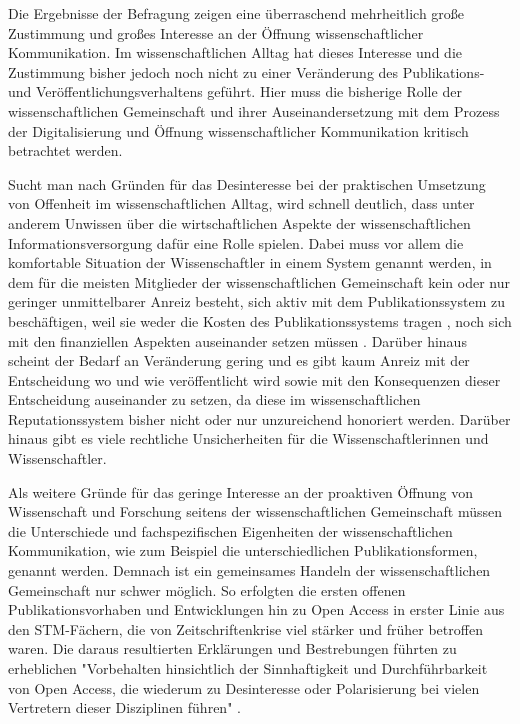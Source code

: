 Die Ergebnisse der Befragung zeigen eine überraschend mehrheitlich große Zustimmung und großes Interesse an der Öffnung wissenschaftlicher Kommunikation. Im wissenschaftlichen Alltag hat dieses Interesse und die Zustimmung bisher jedoch noch nicht zu einer Veränderung des Publikations- und Veröffentlichungsverhaltens geführt. Hier muss die bisherige Rolle der wissenschaftlichen Gemeinschaft und ihrer Auseinandersetzung mit dem Prozess der Digitalisierung und Öffnung wissenschaftlicher Kommunikation kritisch betrachtet werden.

Sucht man nach Gründen für das Desinteresse bei der praktischen Umsetzung von Offenheit im wissenschaftlichen Alltag, wird schnell deutlich, dass unter anderem Unwissen über die wirtschaftlichen Aspekte der wissenschaftlichen Informationsversorgung dafür eine Rolle spielen. Dabei muss vor allem die komfortable Situation der Wissenschaftler in einem System genannt werden, in dem für die meisten Mitglieder der wissenschaftlichen Gemeinschaft kein oder nur geringer unmittelbarer Anreiz besteht, sich aktiv mit dem Publikationssystem zu beschäftigen, weil sie weder die Kosten des Publikationssystems tragen \cite{Sietmann_oa_2007}, noch sich mit den finanziellen Aspekten auseinander setzen müssen \cite{herb_2010}. Darüber hinaus scheint der Bedarf an Veränderung gering und es gibt kaum Anreiz mit der Entscheidung wo und wie veröffentlicht wird sowie mit den Konsequenzen dieser Entscheidung auseinander zu setzen, da diese im wissenschaftlichen Reputationssystem bisher nicht oder nur unzureichend honoriert werden. Darüber hinaus gibt es viele rechtliche Unsicherheiten für die Wissenschaftlerinnen und Wissenschaftler.

Als weitere Gründe für das geringe Interesse an der proaktiven Öffnung von Wissenschaft und Forschung seitens der wissenschaftlichen Gemeinschaft müssen die Unterschiede und fachspezifischen Eigenheiten der wissenschaftlichen Kommunikation, wie zum Beispiel die unterschiedlichen Publikationsformen, genannt werden. Demnach ist ein gemeinsames Handeln der wissenschaftlichen Gemeinschaft nur schwer möglich. So erfolgten die ersten offenen Publikationsvorhaben und Entwicklungen hin zu Open Access in erster Linie aus den STM-Fächern, die von Zeitschriftenkrise viel stärker und früher betroffen waren. Die daraus resultierten Erklärungen und Bestrebungen führten zu erheblichen "Vorbehalten hinsichtlich der Sinnhaftigkeit und Durchführbarkeit von Open Access, die wiederum zu Desinteresse oder Polarisierung bei vielen Vertretern dieser Disziplinen führen" \cite{naeder_2010_open}.

